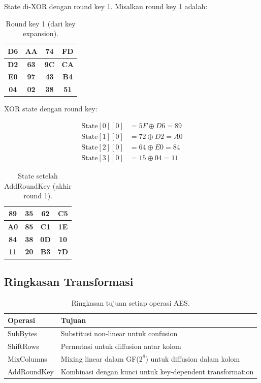 State di-XOR dengan round key 1. Misalkan round key 1 adalah:

\begin{table}[htbp]
  \centering
  \small
  \begin{tabular}{|c|c|c|c|}
    \hline
    \textbf{D6} & \textbf{AA} & \textbf{74} & \textbf{FD} \\
    \hline
    \textbf{D2} & \textbf{63} & \textbf{9C} & \textbf{CA} \\
    \hline
    \textbf{E0} & \textbf{97} & \textbf{43} & \textbf{B4} \\
    \hline
    \textbf{04} & \textbf{02} & \textbf{38} & \textbf{51} \\
    \hline
  \end{tabular}
  \caption{Round key 1 (dari key expansion).}
\end{table}

XOR state dengan round key:

\begin{align*}
\text{State}[0][0] &= 5F \oplus D6 = 89 \\
\text{State}[1][0] &= 72 \oplus D2 = A0 \\
\text{State}[2][0] &= 64 \oplus E0 = 84 \\
\text{State}[3][0] &= 15 \oplus 04 = 11
\end{align*}

\begin{table}[htbp]
  \centering
  \small
  \begin{tabular}{|c|c|c|c|}
    \hline
    \textbf{89} & \textbf{35} & \textbf{62} & \textbf{C5} \\
    \hline
    \textbf{A0} & \textbf{85} & \textbf{C1} & \textbf{1E} \\
    \hline
    \textbf{84} & \textbf{38} & \textbf{0D} & \textbf{10} \\
    \hline
    \textbf{11} & \textbf{20} & \textbf{B3} & \textbf{7D} \\
    \hline
  \end{tabular}
  \caption{State setelah AddRoundKey (akhir round 1).}
\end{table}

\subsection{Ringkasan Transformasi}

\begin{table}[htbp]
  \centering
  \small
  \begin{tabular}{lp{8cm}}
    \toprule
    \textbf{Operasi} & \textbf{Tujuan} \\
    \midrule
    SubBytes & Substitusi non-linear untuk confusion \\
    ShiftRows & Permutasi untuk diffusion antar kolom \\
    MixColumns & Mixing linear dalam GF($2^8$) untuk diffusion dalam kolom \\
    AddRoundKey & Kombinasi dengan kunci untuk key-dependent transformation \\
    \bottomrule
  \end{tabular}
  \caption{Ringkasan tujuan setiap operasi AES.}
\end{table}

